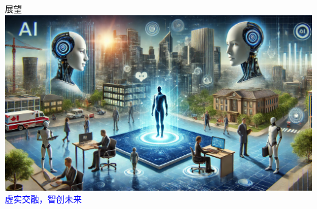 %

\begin{frame}{展望}
  \centering
  \includegraphics[width=1.0\textwidth]{Figures/Future-of-AI_Agents.png}
  \vskip 8pt
  \textcolor{blue}{\Large 虚实交融，智创未来}
\end{frame}
%

